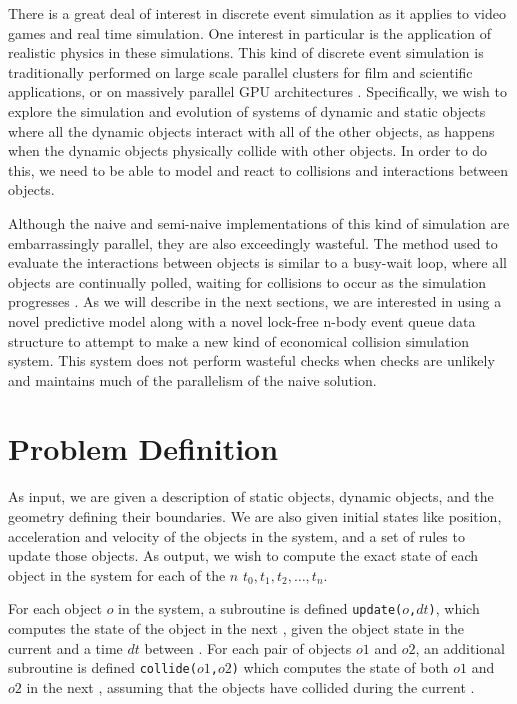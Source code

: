 \documentclass[conference]{IEEEtran}
\begin{document}
There is a great deal of interest in discrete event simulation as it applies to video games and real time simulation. One interest in particular is the application of realistic physics in these simulations.  This kind of discrete event simulation is traditionally performed on large scale parallel clusters for film and scientific applications, or on massively parallel GPU architectures \cite{grape,uberflow}.  Specifically, we wish to explore the simulation and evolution of systems of dynamic and static objects where all the dynamic objects interact with all of the other objects, as happens when the dynamic objects physically collide with other objects.  In order to do this, we need to be able to model and react to collisions and interactions between objects. 

Although the naive and semi-naive implementations of this kind of simulation are embarrassingly parallel, they are also exceedingly wasteful.  The method used to evaluate the interactions between objects is similar to a busy-wait loop, where all objects are continually polled, waiting for collisions to occur as the simulation progresses \cite{nbodycollisions,Moore88collisiondetection}.   As we will describe in the next sections, we are interested in using a novel predictive model along with a novel lock-free n-body event queue data structure to attempt to make a new kind of economical collision simulation system.  This system does not perform wasteful checks when checks are unlikely and maintains much of the parallelism of the naive solution.

\section{Problem Definition}

As input, we are given a description of static objects, dynamic objects, and the geometry defining their boundaries.  We are also given initial states like position, acceleration and velocity of the objects in the system, and a set of rules to update those objects.  As output, we wish to compute the exact state of each object in the system for each of the $n$  $t_0, t_1, t_2, \ldots, t_n$.

For each object $o$ in the system, a subroutine is defined \texttt{update($o$,$dt$)}, which computes the state of the object in the next , given the object state in the current  and a time $dt$ between .  For each pair of objects $o1$ and $o2$, an additional subroutine is defined \texttt{collide($o1$,$o2$)} which computes the state of both $o1$ and $o2$ in the next , assuming that the objects have collided during the current .
\end{document}
